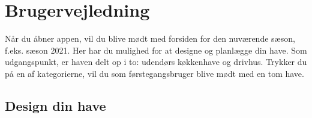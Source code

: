 \section{Brugervejledning}

Når du åbner appen, vil du blive mødt med forsiden for den nuværende sæson, f.eks. sæson 2021. Her har du mulighed for at designe og planlægge din have. Som udgangspunkt, er haven delt op i to: udendørs køkkenhave og drivhus. Trykker du på en af kategorierne, vil du som førstegangsbruger blive mødt med en tom have.

\subsection{Design din have}

\begin{minipage}{0.4\textwidth}
\begin{figure}[H]
    \centering

\end{figure}
\end{minipage}
